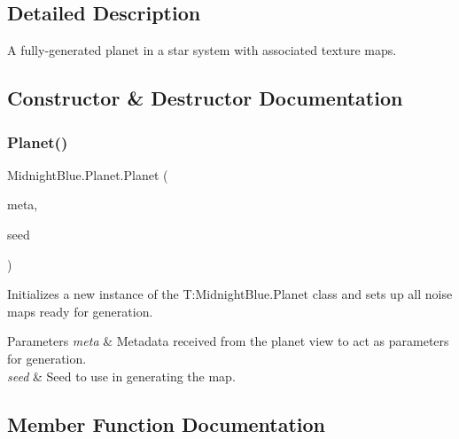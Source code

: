 \subsection{Detailed Description}
A fully-\/generated planet in a star system with associated texture maps. 



\subsection{Constructor \& Destructor Documentation}
\hypertarget{class_midnight_blue_1_1_planet_a649f87901a50e64a6423438504e468a4}{}\label{class_midnight_blue_1_1_planet_a649f87901a50e64a6423438504e468a4} 
\subsubsection{\texorpdfstring{Planet()}{Planet()}}
{\footnotesize\ttfamily Midnight\+Blue.\+Planet.\+Planet (\begin{DoxyParamCaption}\item[{\hyperlink{class_midnight_blue_1_1_planet_metadata}{Planet\+Metadata}}]{meta,  }\item[{int}]{seed }\end{DoxyParamCaption})\hspace{0.3cm}{\ttfamily [inline]}}



Initializes a new instance of the T\+:\+Midnight\+Blue.\+Planet class and sets up all noise maps ready for generation. 


\begin{DoxyParams}{Parameters}
{\em meta} & Metadata received from the planet view to act as parameters for generation.\\
\hline
{\em seed} & Seed to use in generating the map.\\
\hline
\end{DoxyParams}


\subsection{Member Function Documentation}
\hypertarget{class_midnight_blue_1_1_planet_ae39b013905369f01902b4f28d4fc031e}{}\label{class_midnight_blue_1_1_planet_ae39b013905369f01902b4f28d4fc031e} 
